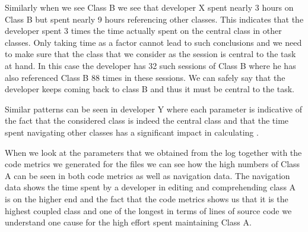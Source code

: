 Similarly when we see Class B we see that developer X spent nearly 3 hours on Class B but spent nearly 9 hours referencing other classes. This indicates that the developer spent 3 times the time actually spent on the central class in other classes. Only taking time as a factor cannot lead to such conclusions and we need to make sure that the class that we consider as the session is central to the task at hand. In this case the developer has 32 such sessions of Class B where he has also referenced Class B 88 times in these sessions. We can safely say that the developer keeps coming back to class B and thus it must be central to the task. 

Similar patterns can be seen in developer Y where each parameter is indicative of the fact that the considered class is indeed the central class and that the time spent navigating other classes has a significant impact in calculating \TD. 

When we look at the parameters that we obtained from the log together with the code metrics we generated for the files we can see how the high numbers of Class A can be seen in both code metrics as well as navigation data. The navigation data shows the time spent by a developer in editing and comprehending class A is on the higher end and the fact that the code metrics shows us that it is the highest coupled class and one of the longest in terms of lines of source code we understand one cause for the high effort spent maintaining Class A.
